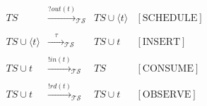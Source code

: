 \documentclass[handout]{beamer}\mode<presentation>{\usetheme{AMSCesenaBleu}}
\begin{document}
\begin{frame}
\begin{columns}
\begin{column}{.75\linewidth}
            \[\begin{array}{rclr}
                TS &\xrightarrow{?out(t)}_\mathcal{TS}& TS \cup \langle t \rangle & [\text{SCHEDULE}] \\
                \\
                TS \cup \langle t \rangle &\xrightarrow{\phantom{ab}\tau\phantom{ab}}_\mathcal{TS}& TS \cup t & [\text{INSERT}] \\
                \\
                TS \cup t &\xrightarrow{!in(t)}_\mathcal{TS}& TS & [\text{CONSUME}] \\
                \\
                TS \cup t &\xrightarrow{!rd(t)}_\mathcal{TS}& TS \cup t & [\text{OBSERVE}] \\
            \end{array}\]
        \end{column}
        \begin{column}{.25\linewidth}

\end{column}
\end{columns}
\end{frame}
\end{document}
